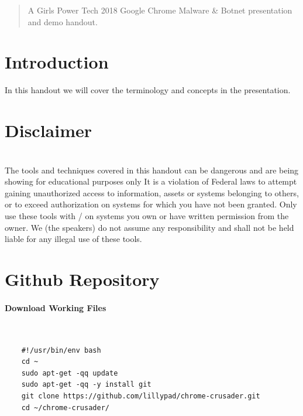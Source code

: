\documentclass{article}
\newcommand\tab[1][0.5cm]{\hspace*{#1}}
\begin{document}
\pagebreak

\tableofcontents

\pagebreak

\begin{abstract}
  A Girls Power Tech 2018 Google Chrome Malware \& Botnet presentation and demo handout.
\end{abstract}

\section{Introduction}
\tab In this handout we will cover the terminology and concepts in the presentation.\\

\section{Disclaimer}\mbox{}\\
\tab The tools and techniques covered in this handout can be dangerous and are being showing for educational purposes only
It is a violation of Federal laws to attempt gaining unauthorized access to information, assets or systems belonging to others, or to exceed authorization on systems for which you have not been granted.
Only use these tools with / on systems you own or have written permission from the owner. We (the speakers) do not assume any responsibility and shall not be held liable for any illegal use of these tools.\\

\pagebreak

\section{Github Repository}
\paragraph{Download Working Files}\mbox{}\\
\begin{tcolorbox}[title=\href{https://github.com/lillypad/chrome-crusader}{chrome-crusader}]
  \begin{verbatim}
    #!/usr/bin/env bash
    cd ~
    sudo apt-get -qq update
    sudo apt-get -qq -y install git
    git clone https://github.com/lillypad/chrome-crusader.git
    cd ~/chrome-crusader/
  \end{verbatim}
\end{tcolorbox}
\end{document}
